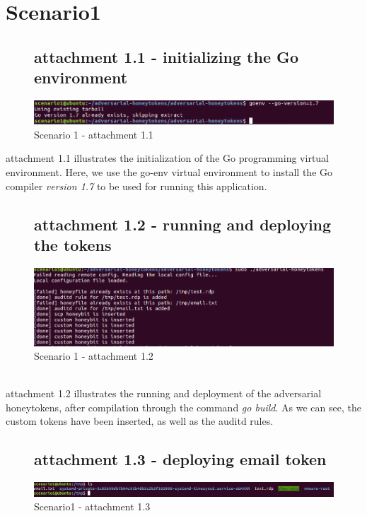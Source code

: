 \documentclass[grad,lot,lof,11pt,oneside,onehalfspace]{RUthesis}
\begin{document}
\section{Scenario1}
\begin{figure}[!hbt]
\subsection{attachment 1.1 - initializing the Go environment}
	\centering
	\includegraphics[width=1.0\linewidth]{"Images/Chapter 7/s1"}
	\caption{Scenario 1 - attachment 1.1}
	\label{fig:s1}
\end{figure}
attachment 1.1 illustrates the initialization of the Go programming virtual environment. Here, we use the go-env virtual environment to install the Go compiler \textit{version 1.7} to be used for running this application.
\begin{figure}[!hpt]
\subsection{attachment 1.2 -  running and deploying the tokens}
\centering
\includegraphics[width=1.0\linewidth]{"Images/Chapter 7/s2"}
\caption{Scenario 1 - attachment 1.2}
\label{fig:s2}
\end{figure}
\\attachment 1.2 illustrates the running and deployment of the adversarial honeytokens, after compilation through the command \textit{go build}. As we can see, the custom tokens have been inserted, as well as the auditd rules. 
\begin{figure}[!hbt]
	\subsection{attachment 1.3 - deploying email token}
	\centering
	\includegraphics[width=1.5\linewidth]{"Images/Chapter 7/s3"}
	\caption{Scenario1 - attachment 1.3}
	\label{fig:s3}
\end{figure}
\end{document}
